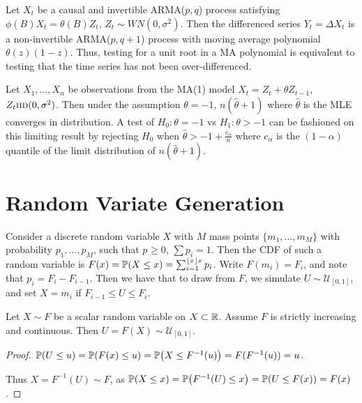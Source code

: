 \begin{thm}
  \label{sec:unit-roots-test}
  Let $X_{t}$ be a causal and invertible ARMA($p, q$) process
  satisfying $\phi(B)X_{t} = \theta(B) Z_{t}$, $Z_{t} \sim WN(0,
  \sigma^{2})$.  Then the differenced series $Y_{t} = \Delta X_{t}$ is
  a non-invertible ARMA($p, q+1$) process with moving average
  polynomial $\theta(z)(1-z)$.  Thus, testing for a unit root in a MA
  polynomial is equivalent to testing that the time series has not been
  over-differenced.

  Let $X_{1}, \dots, X_{n}$ be observations from the MA(1) model $X_{t}
  = Z_{t} + \theta Z_{t-1}$, $Z_{t} \textsc{iid}(0, \sigma^{2})$.  Then under
  the assumption $\theta = -1$, $n(\hat \theta + 1)$ where $\hat
  \theta$ is the MLE converges in distribution.  A test of $H_{0}:
  \theta = -1$ vs $H_{1}: \theta > -1$ can be fashioned on this
  limiting result by rejecting $H_{0}$ when $\hat \theta > -1 +
  \frac{c_{\alpha}}{n}$ where $c_{\alpha}$ is the $(1 - \alpha)$
  quantile of the limit distribution of $n(\hat \theta + 1)$.
\end{thm}


\section{Random Variate Generation}
\label{sec:monte-carlo}

\begin{thm}
  \label{sec:monte-carlo-2}
  Consider a discrete random variable $X$ with $M$ mass points $\{
  m_{1}, \dots, m_{M} \}$ with probability $p_{1}, \dots, p_{M}$, such
  that $p_{} \geq 0$, $\sum p_{i} = 1$.  Then the CDF of such a random
  variable is $F(x) = \Prob{X \leq x} = \sum_{i=1}^{\lfloor x \rfloor
    x} p_{i}$.  Write $F(m_{i}) = F_{i}$, and note that $p_{i} = F_{i}
  - F_{i-1}$.  Then we have that to draw from $F$, we simulate $U \sim
  \mathcal{U}_{[0, 1]}$, and set $X = m_{i}$ if $F_{i-1} \leq U \leq F_{i}$.
\end{thm}

\begin{thm}
  \label{sec:monte-carlo-3}
  Let $X \sim F$ be a scalar random variable on $X \subset \mathbb{R}$.
  Assume $F$ is strictly increasing and continuous.  Then $U = F(X)
  \sim \mathcal{U}_{[0, 1]}$.
\end{thm}

\begin{proof}
  $\Prob{U \leq u} = \Prob{F(x) \leq u} = \Prob{X \leq F^{-1}(u)} =
  F(F^{-1}(u)) = u$.

  Thus $X = F^{-1}(U) \sim F$, as $\Prob{X \leq x} = \Prob{F^{-1}(U)
    \leq x} = \Prob{U \leq F(x)} = F(x)$.
\end{proof}

